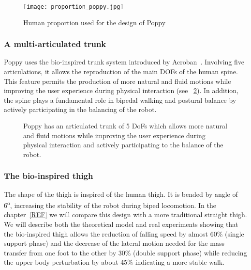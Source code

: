 \begin{figure}[]
    \centering
    \texttt{[image: proportion\_poppy.jpg]}
    \caption{Human proportion used for the design of Poppy~\cite{dufour2005biomecanique}}
    \label{fig:proportion_poppy}
\end{figure}

\subsubsection{A multi-articulated trunk} %

Poppy uses the bio-inspired trunk system introduced by Acroban~\cite{ly2010}. Involving five articulations, it allows the reproduction of the main DOFs of the human spine. This feature permits the production of more natural and fluid motions while improving the user experience during physical interaction (see \figurename~\ref{fig:poppy_multi_articulated_trunk}). In addition, the spine plays a fundamental role in bipedal walking and postural balance by actively participating in the balancing of the robot.

\begin{figure}[]
\centering
    \hfil
    \caption{Poppy has an articulated trunk of 5 DoFs which allows more natural and fluid motions while improving the user experience during physical interaction and actively participating to the balance of the robot.}
    \label{fig:poppy_multi_articulated_trunk}
\end{figure}


\subsubsection{The bio-inspired thigh} %
The shape of the thigh is inspired of the human thigh. It is bended by angle of 6\textsuperscript{o}, increasing the stability of the robot during biped locomotion. In the chapter~\ref{REF} we will compare this design with a more traditional straight thigh. We will describe both the theoretical model and real experiments showing that the bio-inspired thigh allows the reduction of falling speed by almost 60\% (single support phase) and the decrease of the lateral motion needed for the mass transfer from one foot to the other by 30\% (double support phase) while reducing the upper body perturbation by about 45\% indicating a more stable walk.

